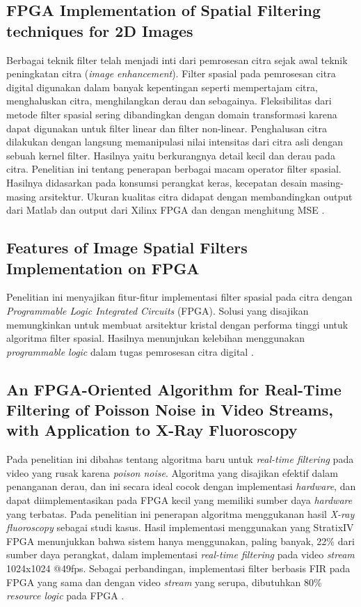 \subsection{FPGA Implementation of Spatial Filtering techniques for 2D Images}
Berbagai teknik filter telah menjadi inti dari pemrosesan citra sejak awal teknik peningkatan citra (\textit{image enhancement}). Filter spasial pada pemrosesan citra digital digunakan dalam banyak kepentingan seperti mempertajam citra, menghaluskan citra, menghilangkan derau dan sebagainya. Fleksibilitas dari metode filter spasial sering dibandingkan dengan domain transformasi karena dapat digunakan untuk filter linear dan filter non-linear. Penghalusan citra dilakukan dengan langsung memanipulasi nilai intensitas dari citra asli dengan sebuah kernel filter. Hasilnya yaitu berkurangnya detail kecil dan derau pada citra. Penelitian ini tentang penerapan berbagai macam operator filter spasial. Hasilnya didasarkan pada konsumsi perangkat keras, kecepatan desain masing-masing arsitektur. Ukuran kualitas citra didapat dengan membandingkan output dari Matlab dan output dari Xilinx FPGA dan dengan menghitung MSE \cite{soa:sushant}.

\newpage

\subsection{Features of Image Spatial Filters Implementation on FPGA}
Penelitian ini menyajikan fitur-fitur implementasi filter spasial pada citra dengan \textit{Programmable Logic Integrated Circuits} (FPGA). Solusi yang disajikan memungkinkan untuk membuat arsitektur kristal dengan performa tinggi untuk algoritma filter spasial. Hasilnya menunjukan kelebihan menggunakan \textit{programmable logic} dalam tugas pemrosesan citra digital \cite{soa:dmitry}.

\subsection{An FPGA-Oriented Algorithm for Real-Time Filtering of Poisson Noise in Video Streams, with Application to X-Ray Fluoroscopy}
Pada penelitian ini dibahas tentang algoritma baru untuk \textit{real-time filtering} pada video yang rusak karena \textit{poison noise}. Algoritma yang disajikan efektif dalam penanganan derau, dan ini secara ideal cocok dengan implementasi \textit{hardware}, dan dapat diimplementasikan pada FPGA kecil yang memiliki sumber daya \textit{hardware} yang terbatas. Pada penelitian ini penerapan algoritma menggukanan hasil \textit{X-ray fluoroscopy} sebagai studi kasus. Hasil implementasi menggunakan yang StratixIV FPGA menunjukkan bahwa sistem hanya menggunakan, paling banyak, 22\% dari sumber daya perangkat, dalam implementasi \textit{real-time filtering} pada video \textit{stream} 1024x1024 @49fps. Sebagai perbandingan, implementasi filter berbasis FIR pada FPGA yang sama dan dengan video \textit{stream} yang serupa, dibutuhkan 80\% \textit{resource logic} pada FPGA \cite{soa:castellano}.

